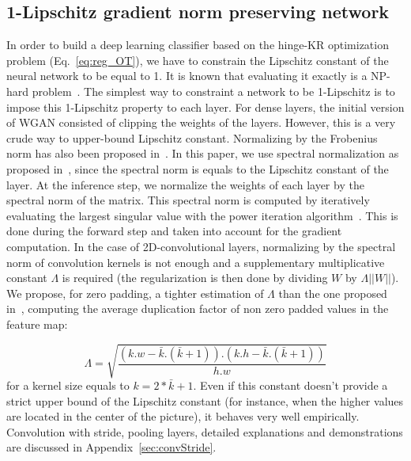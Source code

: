\subsection{1-Lipschitz gradient norm preserving network}
In order to build a deep learning classifier based on the hinge-KR optimization problem (Eq.~\eqref{eq:reg_OT}), we have to constrain the Lipschitz constant of the neural network to be equal to 1.  It is known that evaluating it exactly is a NP-hard problem~\cite{NIPS2018_7640}. The simplest way to constraint a network to be 1-Lipschitz is to impose this 1-Lipschitz property to each layer. For dense layers, the initial version of WGAN \cite{Arjovsky2017} consisted of clipping the weights of the layers. However, this is a very crude way to upper-bound Lipschitz constant. Normalizing by the Frobenius norm has also been proposed in~\cite{SalimansK16}. In this paper, we use spectral normalization as proposed in~\cite{Miyato2018SpectralNF}, since the spectral norm is equals to the Lipschitz constant of the layer. At the inference step, we normalize the weights of each layer by the spectral norm of the matrix. This spectral norm is computed by iteratively evaluating the largest singular value with the power iteration algorithm~\cite{GOLUB200035}. This is done during the forward step and taken into account for the gradient computation. In the case of 2D-convolutional layers, normalizing by the spectral norm of convolution kernels is not enough and a supplementary multiplicative constant $\Lambda$ is required (the regularization is then done by dividing $W$ by $\Lambda||W||$). We propose, for zero padding, a tighter estimation of $\Lambda$ than the one proposed in~\cite{cisse_parseval_2017}, computing the average duplication factor of non zero padded values in the feature map:

\begin{equation}
\Lambda=\sqrt{\frac{(k.w-\bar{k}.(\bar{k}+1)).(k.h-\bar{k}.(\bar{k}+1))}{h.w}}
\label{eq:ConvApproxLip}
\end{equation}
for a kernel size equals to $k=2*\bar{k}+1$.
Even if this constant doesn't provide a strict upper bound of the Lipschitz constant (for instance, when the higher values are located in the center of the picture), it behaves very well empirically.
Convolution with stride, pooling layers, detailed explanations and demonstrations are discussed in Appendix~\ref{sec:convStride}.\\

